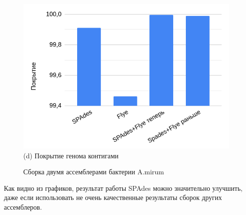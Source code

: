 \documentclass[14pt]{matmex-diploma-custom}
\begin{document}
\begin{figure}[h]
\begin{minipage}{0.5\textwidth}
\end{minipage}
\begin{minipage}{0.5\textwidth}
	\centering
	\includegraphics[scale=0.4]{cov2.png} \small{(d) Покрытие генома контигами}
\end{minipage}
\caption{Сборка двумя ассемблерами бактерии A.mirum}
\label{fig:test2}
\end{figure}

Как видно из графиков, результат работы SPAdes можно значительно улучшить, даже если использовать не очень качественные результаты сборок других ассемблеров.
\end{document}
